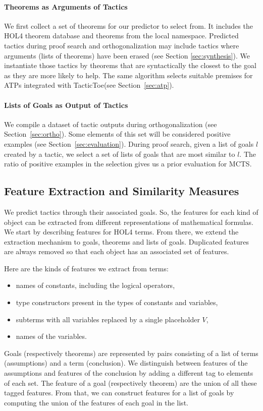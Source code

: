 \documentclass[runningheads,a4paper,draft]{svjour3}
\def\holfour{\textsf{HOL4}\xspace}
\def\tactictoe{\textsf{TacticToe}\xspace}
\begin{document}
\paragraph{Theorems as Arguments of Tactics}
We first collect a set of theorems for our predictor to select from.
It includes the \holfour theorem database and theorems from the local namespace.
Predicted tactics during proof search and orthogonalization may include
tactics where arguments (lists of theorems) have been erased (see Section
\ref{sec:synthesis}).
We instantiate those tactics by theorems that are syntactically the closest to
the goal as they are more likely to help.
The same algorithm selects suitable premises for ATPs integrated with
\tactictoe (see Section~\ref{sec:atp}).

\paragraph{Lists of Goals as Output of Tactics}
We compile a dataset of tactic outputs during orthogonalization (see 
Section~\ref{sec:ortho}).
Some elements of this set will be considered positive examples (see 
Section~\ref{sec:evaluation}).
During proof search, given a list of
goals $l$ created by a tactic, we select a set of lists of goals that are most
similar to $l$. The ratio of positive examples in the selection gives us a
prior evaluation for MCTS.

\subsection{Feature Extraction and Similarity Measures}\label{sec:features}

We predict tactics through their associated goals. So, the features
for each kind of object can be extracted from different representations of
mathematical formulas. We start by describing features for \holfour terms. From
there, we extend the extraction mechanism
to goals, theorems and lists of goals. Duplicated features are always removed
so that each object has an associated set of features.

Here are the kinds of features we extract from terms:
\begin{itemize}
\item names of constants, including the logical operators,
\item type constructors present in the types of constants and variables,
\item subterms with all variables replaced by a single placeholder $V$,
\item names of the variables.
\end{itemize}
Goals (respectively theorems) are represented by pairs consisting of a list of
terms (assumptions) and a term (conclusion). We distinguish between
features of the assumptions and features of the conclusion by adding a
different tag to elements of each set. The feature of a goal (respectively 
theorem)
are the union of all these tagged features. From
that, we can construct features for a list of goals by computing the union of 
the features of each goal in the list.
\end{document}
